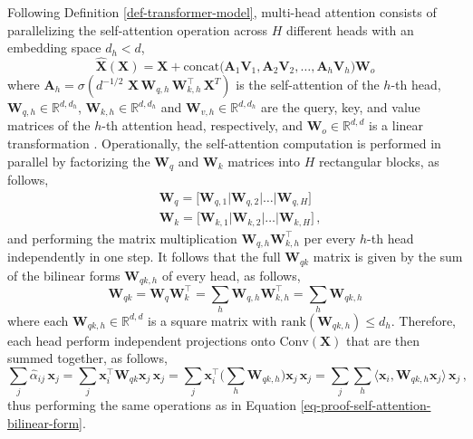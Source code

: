 \begin{remark}
%
Following Definition \ref{def-transformer-model}, multi-head attention consists of parallelizing the self-attention operation across $H$ different heads with an embedding space $d_h < d$, 
%
\begin{equation}
    \hat{\bm{X}}(\bm{X}) = \bm{X} + \text{concat}\big(\bm{A}_1\bm{V}_1, \bm{A}_2\bm{V}_2, \dots, \bm{A}_h\bm{V}_h\big)\bm{W}_o
\end{equation}
%
where $\bm{A}_h = \sigma(d^{-1/2}\,\,\bm{X} \,\bm{W}_{q,h}\,\bm{W}^\top_{k,h}\,\bm{X}^T)$ is the self-attention of the $h$-th head, $\bm{W}_{q,h}\in \mathbb{R}^{d,d_h}$, $\bm{W}_{k,h}\in \mathbb{R}^{d,d_h}$ and $\bm{W}_{v,h}\in \mathbb{R}^{d,d_h}$ are the query, key, and value matrices of the $h$-th attention head, respectively, and $\bm{W}_o \in \mathbb{R}^{d,d}$ is a linear transformation \citep{vaswaniAttentionAllYou2017}.
%
Operationally, the self-attention computation is performed in parallel by factorizing the $\bm{W}_q$ and $\bm{W}_k$ matrices into $H$ rectangular blocks, as follows,
%
\begin{equation}
\begin{split}
    & \bm{W}_q = \big[\bm{W}_{q,1} \big| \bm{W}_{q,2} \big| \dots \big| \bm{W}_{q,H}\big] \\
    & \bm{W}_k = \big[\bm{W}_{k,1} \big| \bm{W}_{k,2} \big| \dots \big| \bm{W}_{k,H}\big] \,,
\end{split}
\end{equation}
%
and performing the matrix multiplication $\bm{W}_{q,h}\bm{W}_{k,h}^\top$ per every $h$-th head independently in one step.
%
It follows that the full $\bm{W}_{qk}$ matrix is given by the sum of the bilinear forms $\bm{W}_{qk,h}$ of every head, as follows,
%
\begin{equation}
    \bm{W}_{qk} = \bm{W}_q\bm{W}_k^\top = \sum_h \bm{W}_{q,h}\bm{W}^\top_{k,h} = \sum_h \bm{W}_{qk,h}
\end{equation}
%
where each $\bm{W}_{qk,h} \in \mathbb{R}^{d,d}$ is a square matrix with $\text{rank}(\bm{W}_{qk,h}) \leq d_h$.
%
Therefore, each head perform independent projections onto $\text{Conv}(\bm{X})$ that are then summed together, as follows,
%
\begin{equation}
    \sum_j\hat{\alpha}_{ij}\, \bm{x}_j = \sum_j \bm{x}_i^\top \bm{W}_{qk} \bm{x}_j\,\bm{x}_j = 
    \sum_j \bm{x}_i^\top \Big(\sum_h\bm{W}_{qk,h}\Big) \bm{x}_j\,\bm{x}_j = \sum_j \sum_h \langle \bm{x}_i, \bm{W}_{qk,h}\bm{x}_j \rangle \,\bm{x}_j \,,
\end{equation}
%
thus performing the same operations as in Equation \eqref{eq-proof-self-attention-bilinear-form}.
%
\end{remark}
%